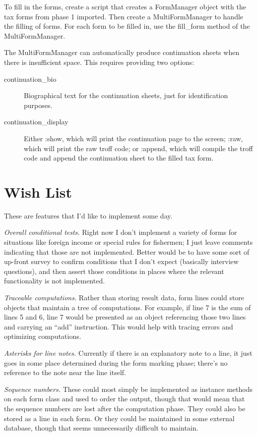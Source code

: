 \documentclass[12pt]{article}
\begin{document}
To fill in the forms, create a script that creates a FormManager object with the
tax forms from phase 1 imported. Then create a MultiFormManager to handle the
filling of forms. For each form to be filled in, use the fill\_form method of
the MultiFormManager.

The MultiFormManager can automatically produce continuation sheets when there is
insufficient space. This requires providing two options:
\begin{description}
\item[continuation\_bio] Biographical text for the continuation sheets, just for
identification purposes.
\item[continuation\_display] Either :show, which will print the continuation
page to the screen; :raw, which will print the raw troff code; or :append, which
will compile the troff code and append the continuation sheet to the filled tax
form.
\end{description}





\section{Wish List}

These are features that I'd like to implement some day.

\emph{Overall conditional tests.} Right now I don't implement a variety of forms
for situations like foreign income or special rules for fishermen; I just leave
comments indicating that those are not implemented. Better would be to have some
sort of up-front survey to confirm conditions that I don't expect (basically
interview questions), and then assert those conditions in places where the
relevant functionality is not implemented.

\emph{Traceable computations.} Rather than storing result data, form lines could
store objects that maintain a tree of computations. For example, if line 7 is
the sum of lines 5 and 6, line 7 would be presented as an object referencing
those two lines and carrying an ``add'' instruction. This would help with
tracing errors and optimizing computations.

\emph{Asterisks for line notes.} Currently if there is an explanatory note to a
line, it just goes in some place determined during the form marking phase;
there's no reference to the note near the line itself.

\emph{Sequence numbers.} These could most simply be implemented as instance
methods on each form class and used to order the output, though that would mean
that the sequence numbers are lost after the computation phase. They could also
be stored as a line in each form. Or they could be maintained in some external
database, though that seems unnecessarily difficult to maintain.
\end{document}
